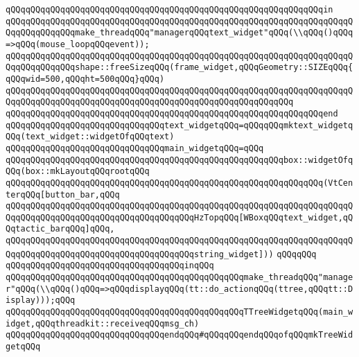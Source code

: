\verb|qQQqqQQqqQQqqQQqqQQqqQQqqQQqqQQqqQQqqQQqqQQqqQQqqQQqqQQqqQQqqQQqin|\newline
\verb|qQQqqQQqqQQqqQQqqQQqqQQqqQQqqQQqqQQqqQQqqQQqqQQqqQQqqQQqqQQqqQQqqQQqqQQqqQQqqQQqqQQqmake_threadqQQq"managerqQQqtext_widget"qQQq(\\qQQq()qQQq=>qQQq(mouse_loopqQQqevent));|\newline
\verb|qQQqqQQqqQQqqQQqqQQqqQQqqQQqqQQqqQQqqQQqqQQqqQQqqQQqqQQqqQQqqQQqqQQqqQQqqQQqqQQqqQQqshape::freeSizeqQQq(frame_widget,qQQqGeometry::SIZEqQQq{qQQqwid=500,qQQqht=500qQQq}qQQq)|\newline
\verb|qQQqqQQqqQQqqQQqqQQqqQQqqQQqqQQqqQQqqQQqqQQqqQQqqQQqqQQqqQQqqQQqqQQqqQQqqQQqqQQqqQQqqQQqqQQqqQQqqQQqqQQqqQQqqQQqqQQqqQQqqQQqqQQq|\newline
\verb|qQQqqQQqqQQqqQQqqQQqqQQqqQQqqQQqqQQqqQQqqQQqqQQqqQQqqQQqqQQqqQQqend|\newline
\newline
\verb|qQQqqQQqqQQqqQQqqQQqqQQqqQQqqQQqtext_widgetqQQq=qQQqqQQqmktext_widgetqQQq(text_widget::widgetOfqQQqtext)|\newline
\newline
\verb|qQQqqQQqqQQqqQQqqQQqqQQqqQQqqQQqmain_widgetqQQq=qQQq|\newline
\verb|qQQqqQQqqQQqqQQqqQQqqQQqqQQqqQQqqQQqqQQqqQQqqQQqqQQqqQQqbox::widgetOfqQQq(box::mkLayoutqQQqrootqQQq|\newline
\verb|qQQqqQQqqQQqqQQqqQQqqQQqqQQqqQQqqQQqqQQqqQQqqQQqqQQqqQQqqQQqqQQq(VtCenterqQQq[button_bar,qQQq|\newline
\verb|qQQqqQQqqQQqqQQqqQQqqQQqqQQqqQQqqQQqqQQqqQQqqQQqqQQqqQQqqQQqqQQqqQQqqQQqqQQqqQQqqQQqqQQqqQQqqQQqqQQqqQQqqQQqHzTopqQQq[WBoxqQQqtext_widget,qQQqtactic_barqQQq]qQQq,|\newline
\verb|qQQqqQQqqQQqqQQqqQQqqQQqqQQqqQQqqQQqqQQqqQQqqQQqqQQqqQQqqQQqqQQqqQQqqQQqqQQqqQQqqQQqqQQqqQQqqQQqqQQqqQQqqQQqstring_widget]))|\newline
\verb|qQQqqQQq|\newline
\verb|qQQqqQQqqQQqqQQqqQQqqQQqqQQqqQQqqQQqinqQQq|\newline
\verb|qQQqqQQqqQQqqQQqqQQqqQQqqQQqqQQqqQQqqQQqqQQqqQQqmake_threadqQQq"manager"qQQq(\\qQQq()qQQq=>qQQqdisplayqQQq(tt::do_actionqQQq(ttree,qQQqtt::Display)));qQQq|\newline
\verb|qQQqqQQqqQQqqQQqqQQqqQQqqQQqqQQqqQQqqQQqqQQqqQQqTTreeWidgetqQQq(main_widget,qQQqthreadkit::receiveqQQqmsg_ch)|\newline
\verb|qQQqqQQqqQQqqQQqqQQqqQQqqQQqqQQqendqQQq#qQQqqQQqendqQQqofqQQqmkTreeWidgetqQQq|\newline
